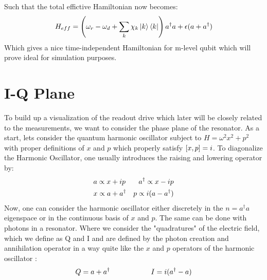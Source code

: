 Such that the total effictive Hamiltonian now becomes:
\begin{equation}
    H_{eff} =  \left(\omega_r - \omega_d + \sum_k \chi_k \ket{k}\bra{k}\right)a^\dagger a + \epsilon(a + a^\dagger)
\end{equation}
Which gives a nice time-independent Hamiltonian for m-level qubit which will prove ideal for simulation purposes. %



\section{I-Q Plane}
To build up a visualization of the readout drive which later will be closely related to the measurements, we want to consider the phase plane of the resonator. As a start, lets consider the quantum harmonic oscillator subject to $H = \omega^2  x^2 + p^2$ with proper definitions of $x$ and $p$ which properly satisfy $\comm{x}{p} = i$. To diagonalize the Harmonic Oscillator, one usually introduces the raising and lowering operator by:
\begin{align}
    &a \propto x + ip \hfill &a^\dagger \propto x - ip \\
    &x \propto a + a^\dagger \hfill &p\propto i (a - a^\dagger)
\end{align}
Now, one can consider the harmonic oscillator either discretely in the $n = a^\dagger a$ eigenspace or in the continuous basis of $x$ and $p$. The same can be done with photons in a resonator. Where we consider the "quadratures" of the electric field, which we define as Q and I and are defined by the photon creation and annihilation operator in a way quite like the $x$ and $p$ operators of the harmonic oscillator \cite{knight}:
\begin{equation}
    Q = a + a^\dagger \hspace{2 cm} I = i(a^\dagger - a)
\end{equation}

